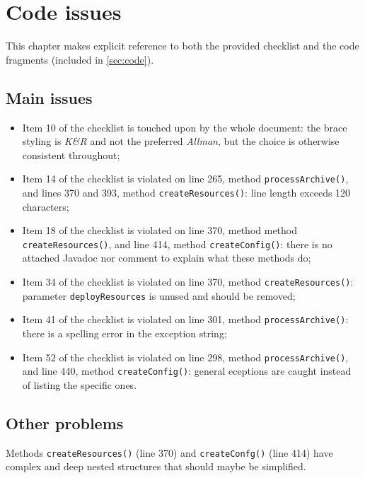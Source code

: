 \chapter{Code issues}
This chapter makes explicit reference to both the provided checklist and the code fragments (included in \autoref{sec:code}).

\section{Main issues}
\begin{itemize}
\item Item 10 of the checklist is touched upon by the whole document: the brace styling is \emph{K\&R} and not the preferred \emph{Allman}, but the choice is otherwise consistent throughout;
\item Item 14 of the checklist is violated on line 265, method \texttt{processArchive()}, and lines 370 and 393, method \texttt{createResources()}: line length exceeds 120 characters;
\item Item 18 of the checklist is violated on line 370, method method \texttt{create\-Resources()}, and line 414, method \texttt{createConfig()}: there is no attached Javadoc nor comment to explain what these methods do;
\item Item 34 of the checklist is violated on line 370, method \texttt{createResources()}: parameter \texttt{deployResources} is unused and should be removed;
\item Item 41 of the checklist is violated on line 301, method \texttt{processArchive()}: there is a spelling error in the exception string;
\item Item 52 of the checklist is violated on line 298, method \texttt{processArchive()}, and line 440, method \texttt{createConfig()}: general eceptions are caught instead of listing the specific ones.
\end{itemize}

\section{Other problems}
Methods \texttt{createResources()} (line 370) and \texttt{createConfg()} (line 414) have complex and deep nested structures that should maybe be simplified.
